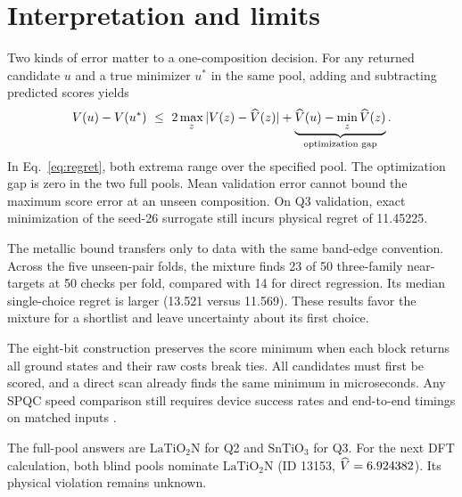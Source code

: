 \section{Interpretation and limits}
Two kinds of error matter to a one-composition decision. For any returned candidate $u$ and a true minimizer $u^*$ in the same pool, adding and subtracting predicted scores yields
\begin{equation}
 V(u)-V(u^*)\ \leq\
 2\max_{z}|V(z)-\widehat V(z)|+
 \underbrace{\widehat V(u)-\min_z\widehat V(z)}_{\text{optimization gap}} .
 \label{eq:regret}
\end{equation}
In Eq.~\eqref{eq:regret}, both extrema range over the specified pool. The optimization gap is zero in the two full pools. Mean validation error cannot bound the maximum score error at an unseen composition. On Q3 validation, exact minimization of the seed-26 surrogate still incurs physical regret of 11.45225.

The metallic bound transfers only to data with the same band-edge convention. Across the five unseen-pair folds, the mixture finds 23 of 50 three-family near-targets at 50 checks per fold, compared with 14 for direct regression. Its median single-choice regret is larger (13.521 versus 11.569). These results favor the mixture for a shortlist and leave uncertainty about its first choice.

The eight-bit construction preserves the score minimum when each block returns all ground states and their raw costs break ties. All candidates must first be scored, and a direct scan already finds the same minimum in microseconds. Any SPQC speed comparison still requires device success rates and end-to-end timings on matched inputs \cite{speed}.

The full-pool answers are $\mathrm{LaTiO_2N}$ for Q2 and $\mathrm{SnTiO_3}$ for Q3. For the next DFT calculation, both blind pools nominate $\mathrm{LaTiO_2N}$ (ID 13153, $\widehat V=6.924382$). Its physical violation remains unknown.
